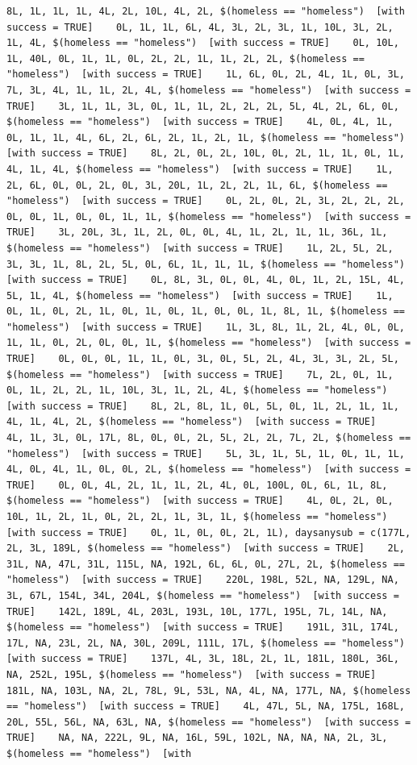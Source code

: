 \documentclass{tufte-book}\usepackage[]{graphicx}\usepackage[]{xcolor}
\makeatletter
\newenvironment{kframe}{%
 \def\at@end@of@kframe{}%
 \ifinner\ifhmode%
  \def\at@end@of@kframe{\end{minipage}}%
  \begin{minipage}{\columnwidth}%
 \fi\fi%
 \def\FrameCommand##1{\hskip\@totalleftmargin \hskip-\fboxsep
 \colorbox{shadecolor}{##1}\hskip-\fboxsep
     \hskip-\linewidth \hskip-\@totalleftmargin \hskip\columnwidth}%
 \MakeFramed {\advance\hsize-\width
   \@totalleftmargin\z@ \linewidth\hsize
   \@setminipage}}%
 {\par\unskip\endMakeFramed%
 \at@end@of@kframe}
\newenvironment{knitrout}{}{} %
\makeatother
\begin{document}
\begin{knitrout}
\begin{kframe}
\begin{verbatim}
8L, 1L, 1L, 1L, 4L, 2L, 10L, 4L, 2L, $(homeless == "homeless")  [with success = TRUE]    0L, 1L, 1L, 6L, 4L, 3L, 2L, 3L, 1L, 10L, 3L, 2L, 1L, 4L, $(homeless == "homeless")  [with success = TRUE]    0L, 10L, 1L, 40L, 0L, 1L, 1L, 0L, 2L, 2L, 1L, 1L, 2L, 2L, $(homeless == "homeless")  [with success = TRUE]    1L, 6L, 0L, 2L, 4L, 1L, 0L, 3L, 7L, 3L, 4L, 1L, 1L, 2L, 4L, $(homeless == "homeless")  [with success = TRUE]    3L, 1L, 1L, 3L, 0L, 1L, 1L, 2L, 2L, 2L, 5L, 4L, 2L, 6L, 0L, $(homeless == "homeless")  [with success = TRUE]    4L, 0L, 4L, 1L, 0L, 1L, 1L, 4L, 6L, 2L, 6L, 2L, 1L, 2L, 1L, $(homeless == "homeless")  [with success = TRUE]    8L, 2L, 0L, 2L, 10L, 0L, 2L, 1L, 1L, 0L, 1L, 4L, 1L, 4L, $(homeless == "homeless")  [with success = TRUE]    1L, 2L, 6L, 0L, 0L, 2L, 0L, 3L, 20L, 1L, 2L, 2L, 1L, 6L, $(homeless == "homeless")  [with success = TRUE]    0L, 2L, 0L, 2L, 3L, 2L, 2L, 2L, 0L, 0L, 1L, 0L, 0L, 1L, 1L, $(homeless == "homeless")  [with success = TRUE]    3L, 20L, 3L, 1L, 2L, 0L, 0L, 4L, 1L, 2L, 1L, 1L, 36L, 1L, $(homeless == "homeless")  [with success = TRUE]    1L, 2L, 5L, 2L, 3L, 3L, 1L, 8L, 2L, 5L, 0L, 6L, 1L, 1L, 1L, $(homeless == "homeless")  [with success = TRUE]    0L, 8L, 3L, 0L, 0L, 4L, 0L, 1L, 2L, 15L, 4L, 5L, 1L, 4L, $(homeless == "homeless")  [with success = TRUE]    1L, 0L, 1L, 0L, 2L, 1L, 0L, 1L, 0L, 1L, 0L, 0L, 1L, 8L, 1L, $(homeless == "homeless")  [with success = TRUE]    1L, 3L, 8L, 1L, 2L, 4L, 0L, 0L, 1L, 1L, 0L, 2L, 0L, 0L, 1L, $(homeless == "homeless")  [with success = TRUE]    0L, 0L, 0L, 1L, 1L, 0L, 3L, 0L, 5L, 2L, 4L, 3L, 3L, 2L, 5L, $(homeless == "homeless")  [with success = TRUE]    7L, 2L, 0L, 1L, 0L, 1L, 2L, 2L, 1L, 10L, 3L, 1L, 2L, 4L, $(homeless == "homeless")  [with success = TRUE]    8L, 2L, 8L, 1L, 0L, 5L, 0L, 1L, 2L, 1L, 1L, 4L, 1L, 4L, 2L, $(homeless == "homeless")  [with success = TRUE]    4L, 1L, 3L, 0L, 17L, 8L, 0L, 0L, 2L, 5L, 2L, 2L, 7L, 2L, $(homeless == "homeless")  [with success = TRUE]    5L, 3L, 1L, 5L, 1L, 0L, 1L, 1L, 4L, 0L, 4L, 1L, 0L, 0L, 2L, $(homeless == "homeless")  [with success = TRUE]    0L, 0L, 4L, 2L, 1L, 1L, 2L, 4L, 0L, 100L, 0L, 6L, 1L, 8L, $(homeless == "homeless")  [with success = TRUE]    4L, 0L, 2L, 0L, 10L, 1L, 2L, 1L, 0L, 2L, 2L, 1L, 3L, 1L, $(homeless == "homeless")  [with success = TRUE]    0L, 1L, 0L, 0L, 2L, 1L), daysanysub = c(177L, 2L, 3L, 189L, $(homeless == "homeless")  [with success = TRUE]    2L, 31L, NA, 47L, 31L, 115L, NA, 192L, 6L, 6L, 0L, 27L, 2L, $(homeless == "homeless")  [with success = TRUE]    220L, 198L, 52L, NA, 129L, NA, 3L, 67L, 154L, 34L, 204L, $(homeless == "homeless")  [with success = TRUE]    142L, 189L, 4L, 203L, 193L, 10L, 177L, 195L, 7L, 14L, NA, $(homeless == "homeless")  [with success = TRUE]    191L, 31L, 174L, 17L, NA, 23L, 2L, NA, 30L, 209L, 111L, 17L, $(homeless == "homeless")  [with success = TRUE]    137L, 4L, 3L, 18L, 2L, 1L, 181L, 180L, 36L, NA, 252L, 195L, $(homeless == "homeless")  [with success = TRUE]    181L, NA, 103L, NA, 2L, 78L, 9L, 53L, NA, 4L, NA, 177L, NA, $(homeless == "homeless")  [with success = TRUE]    4L, 47L, 5L, NA, 175L, 168L, 20L, 55L, 56L, NA, 63L, NA, $(homeless == "homeless")  [with success = TRUE]    NA, NA, 222L, 9L, NA, 16L, 59L, 102L, NA, NA, NA, 2L, 3L, $(homeless == "homeless")  [with 
\end{verbatim}
\end{kframe}
\end{knitrout}
\end{document}
